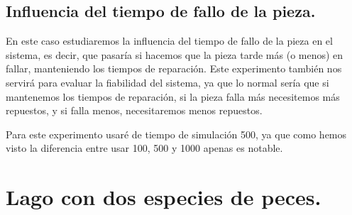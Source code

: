 \documentclass[12pt, spanish]{article}
\begin{document}
\subsection{Influencia del tiempo de fallo de la pieza.}

En este caso estudiaremos la influencia del tiempo de fallo de la pieza en el sistema, es decir, que pasaría si hacemos que la pieza tarde más (o menos) en fallar, manteniendo los tiempos de reparación. Este experimento también nos servirá para evaluar la fiabilidad del sistema, ya que lo normal sería que si mantenemos los tiempos de reparación, si la pieza falla más necesitemos más repuestos, y si falla menos, necesitaremos menos repuestos.

Para este experimento usaré de tiempo de simulación 500, ya que como hemos visto la diferencia entre usar 100, 500 y 1000 apenas es notable.



\section{Lago con dos especies de peces.}

\newpage


\begin{thebibliography}{9}


\end{thebibliography}
\end{document}
